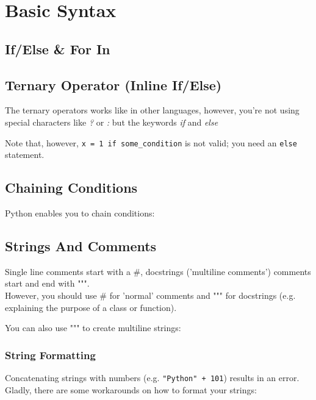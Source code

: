 \section{Basic Syntax}

  \subsection{If/Else \& For In}

  \subsection{Ternary Operator (Inline If/Else)}
    The ternary operators works like in other languages, however, you're not using special
    characters like \textit{?} or \textit{:} but the keywords \textit{if} and \textit{else}
    
    Note that, however, \texttt{x = 1 if some_condition} is not valid; you need an
    \texttt{else} statement.

  \subsection{Chaining Conditions}
    Python enables you to chain conditions:
    

  \subsection{Strings And Comments}
    Single line comments start with a \#, docstrings ('multiline comments') comments start and end
    with """. \\
    However, you should use \# for 'normal' comments and """ for docstrings (e.g. explaining the
    purpose of a class or function).
    
    You can also use """ to create multiline strings:
    
  
    \subsubsection{String Formatting}
      Concatenating strings with numbers (e.g. \texttt{"Python" + 101}) results in an
      error. \\
      Gladly, there are some workarounds on how to format your strings:
    
